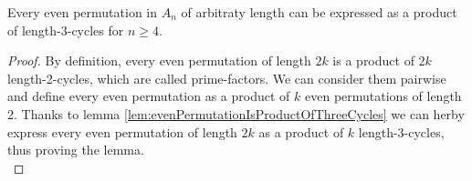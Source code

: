 \begin{lemma}
    \label{lem:evenPermutationIsProductOfThreeCycles}
    Every even permutation in $A_n$ of arbitraty length can be expressed 
    as a product of length-3-cycles for $n \geq 4$.
\end{lemma}
\begin{proof}
    By definition, every even permutation of length $2k$ is a product of $2k$ length-2-cycles, which 
    are called prime-factors. We can consider them pairwise and define every even permutation 
    as a product of $k$ even permutations of length 2. Thanks to lemma 
    \ref{lem:evenPermutationIsProductOfThreeCycles} we can herby
    express every even permutation of length $2k$ as a product of $k$ length-3-cycles,
    thus proving the lemma. \\
\end{proof} \vspace{0.2em}

\newpage
